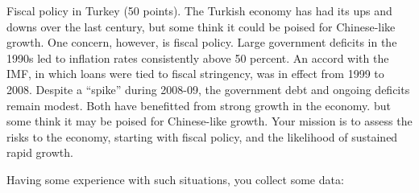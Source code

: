 \documentclass[12pt]{exam}
\begin{document}
\begin{questions}
\begin{solution}
\end{solution}


\question Fiscal policy in Turkey (50 points).
The Turkish economy has had its ups and downs over the last century,
but some think it could be poised for Chinese-like growth.
One concern, however, is fiscal policy.
Large government deficits in the 1990s led to inflation rates
consistently above 50 percent.
 An accord with the IMF, in which loans were tied to fiscal stringency,
  was in effect from 1999 to 2008.
  Despite a ``spike'' during 2008-09, the government debt and ongoing deficits
    remain modest.
    Both have benefitted from strong growth in the economy.
but some think it may be poised for Chinese-like growth.
Your mission is to assess the risks to the economy,
starting with fiscal policy,
and the likelihood of sustained rapid growth.

Having some experience with such situations,
you collect some data:


\end{questions}
\end{document}
